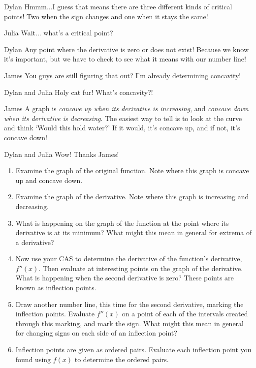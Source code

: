 \documentclass{ximera}
\begin{document}
\begin{enumerate}
\begin{dialogue}
\item[Dylan] Hmmm...I guess that means there are three different kinds of critical points! Two when the sign changes and one when it stays the same!
\item[Julia] Wait... what's a critical point?
\item[Dylan] Any point where the derivative is zero or does not exist! Because we know it's important, but we have to check to see what it means with our number line!
\item[James] You guys are still figuring that out? I'm already determining concavity!
\item[Dylan and Julia] Holy cat fur! What's concavity?!
\item[James] A graph is \textit{concave up when its derivative is increasing}, and \textit{concave down when its derivative is decreasing}. The easiest way to tell is to look at the curve and think `Would this hold water?' If it would, it's concave up, and if not, it's concave down!
\item[Dylan and Julia] Wow! Thanks James!
\end{dialogue}
\begin{enumerate}
\item{Examine the graph of the original function. Note where this graph is concave up and concave down.}
\item{Examine the graph of the derivative. Note where this graph is increasing and decreasing.}
\item{What is happening on the graph of the function at the point where its derivative is at its minimum? What might this mean in general for extrema of a derivative?}
\item{Now use your CAS to determine the derivative of the function's derivative, $f''(x)$. Then evaluate at interesting points on the graph of the derivative. What is happening when the second derivative is zero? These points are known as inflection points.}
\item{Draw another number line, this time for the second derivative, marking the inflection points. Evaluate $f''(x)$ on a point of each of the intervals created through this marking, and mark the sign. What might this mean in general for changing signs on each side of an inflection point?}
\item{Inflection points are given as ordered pairs. Evaluate each inflection point you found using $f(x)$ to determine the ordered pairs.}
\end{enumerate}
\end{enumerate}
\end{document}
